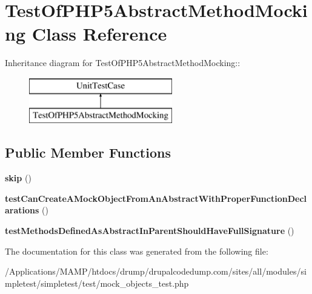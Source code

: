 \hypertarget{class_test_of_p_h_p5_abstract_method_mocking}{
\section{TestOfPHP5AbstractMethodMocking Class Reference}
\label{class_test_of_p_h_p5_abstract_method_mocking}
}
Inheritance diagram for TestOfPHP5AbstractMethodMocking::\begin{figure}[H]
\begin{center}
\leavevmode
\includegraphics[height=2cm]{class_test_of_p_h_p5_abstract_method_mocking}
\end{center}
\end{figure}
\subsection*{Public Member Functions}
\begin{DoxyCompactItemize}
\item 
\hypertarget{class_test_of_p_h_p5_abstract_method_mocking_ada528ae8ce55b4f28bce68805c093ad5}{
{\bfseries skip} ()}
\label{class_test_of_p_h_p5_abstract_method_mocking_ada528ae8ce55b4f28bce68805c093ad5}

\item 
\hypertarget{class_test_of_p_h_p5_abstract_method_mocking_a4087daa795895c8eb4109e9472c27f97}{
{\bfseries testCanCreateAMockObjectFromAnAbstractWithProperFunctionDeclarations} ()}
\label{class_test_of_p_h_p5_abstract_method_mocking_a4087daa795895c8eb4109e9472c27f97}

\item 
\hypertarget{class_test_of_p_h_p5_abstract_method_mocking_a739baa7fa1aa911162b7255ed775cd9c}{
{\bfseries testMethodsDefinedAsAbstractInParentShouldHaveFullSignature} ()}
\label{class_test_of_p_h_p5_abstract_method_mocking_a739baa7fa1aa911162b7255ed775cd9c}

\end{DoxyCompactItemize}


The documentation for this class was generated from the following file:\begin{DoxyCompactItemize}
\item 
/Applications/MAMP/htdocs/drump/drupalcodedump.com/sites/all/modules/simpletest/simpletest/test/mock\_\-objects\_\-test.php\end{DoxyCompactItemize}
